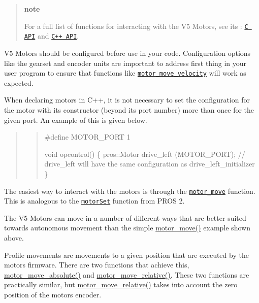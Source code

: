 \begin{quote}
{\bfseries note}

For a full list of functions for interacting with the V5 Motors, see its \+: \href{../../api/c/motors.html}{\tt C A\+PI} and \href{../../api/cpp/motors.html}{\tt C++ A\+PI}. \end{quote}


V5 Motors should be configured before use in your code. Configuration options like the gearset and encoder units are important to address first thing in your user program to ensure that functions like \href{../../api/c/motors.html#motor-move-velocity}{\tt motor\+\_\+move\+\_\+velocity} will work as expected.

When declaring motors in C++, it is not necessary to set the configuration for the motor with its constructor (beyond its port number) more than once for the given port. An example of this is given below.

\begin{quote}
\begin{quote}

\begin{DoxyCode}
#define MOTOR\_PORT 1

void opcontrol() \{
  pros::Motor drive\_left (MOTOR\_PORT);
  // drive\_left will have the same configuration as drive\_left\_initializer
\}
\end{DoxyCode}
 \end{quote}
\end{quote}


The easiest way to interact with the motors is through the \href{../../api/c/motors.html#motor-move}{\tt motor\+\_\+move} function. This is analogous to the \href{../../../cortex/api/index.html#motorSet}{\tt motor\+Set} function from P\+R\+OS 2.

The V5 Motors can move in a number of different ways that are better suited towards autonomous movement than the simple {\ttfamily \hyperlink{motors_8h_a7da9bf1e229e50bfeeaecf026a6d0d08}{motor\+\_\+move()}} example shown above.

Profile movements are movements to a given position that are executed by the motor\textquotesingle{}s firmware. There are two functions that achieve this, {\ttfamily \hyperlink{motors_8h_ab70bf4937f1b5cefa15c11c15314c90e}{motor\+\_\+move\+\_\+absolute()}} and {\ttfamily \hyperlink{motors_8h_ab4c1ba35d69e8e9b49df0e848fa305d3}{motor\+\_\+move\+\_\+relative()}}. These two functions are practically similar, but {\ttfamily \hyperlink{motors_8h_ab4c1ba35d69e8e9b49df0e848fa305d3}{motor\+\_\+move\+\_\+relative()}} takes into account the zero position of the motor\textquotesingle{}s encoder.

